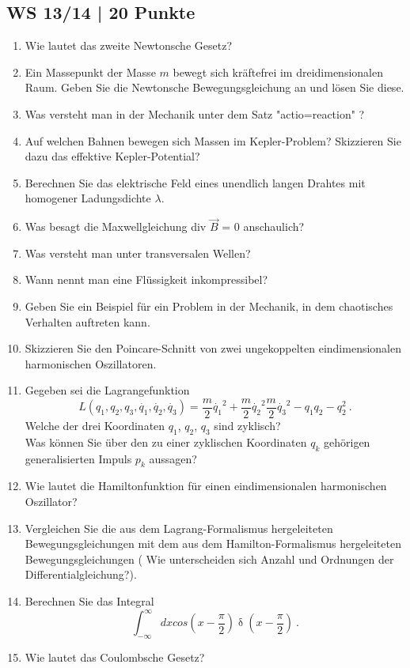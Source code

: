 \subsection{WS 13/14 | 20 Punkte}
\begin{enumerate}
    \item Wie lautet das zweite Newtonsche Gesetz?
    \item Ein Massepunkt der Masse $m$ bewegt sich kräftefrei im dreidimensionalen Raum. Geben Sie die Newtonsche Bewegungsgleichung an und lösen Sie diese.
    \item Was versteht man in der Mechanik unter dem Satz  "actio=reaction" ? 
    \item Auf welchen Bahnen bewegen sich Massen im Kepler-Problem? Skizzieren Sie dazu das effektive Kepler-Potential?
    \item Berechnen Sie das elektrische Feld eines unendlich langen Drahtes mit homogener Ladungsdichte $\lambda$.
    \item Was besagt die Maxwellgleichung div $\vec{B}$ = 0 anschaulich?
    \item Was versteht man unter transversalen Wellen?
    \item Wann nennt man eine Flüssigkeit inkompressibel?
    \item Geben Sie ein Beispiel für ein Problem in der Mechanik, in dem chaotisches Verhalten auftreten kann.
    \item Skizzieren Sie den Poincare-Schnitt von zwei ungekoppelten eindimensionalen harmonischen Oszillatoren.
    \item Gegeben sei die Lagrangefunktion
    \begin{equation*}
        L (q_1, q_2, q_3, \dot{q_1}, \dot{q_2}, \dot{q_3}) = \frac{m}{2} \dot{q_1}^2 +  \frac{m}{2} \dot{q_2}^2 \frac{m}{2} \dot{q_3}^2 - q_1 q_2 - q_2^2 \medspace .
    \end{equation*}
            Welche der drei Koordinaten $q_1$, $q_2$, $q_3$ sind zyklisch?\\
            Was können Sie über den zu einer zyklischen Koordinaten $q_k$ gehörigen generalisierten Impuls $p_k$ aussagen?
    \item Wie lautet die Hamiltonfunktion für einen eindimensionalen harmonischen Oszillator?
    \item Vergleichen Sie die aus dem Lagrang-Formalismus hergeleiteten Bewegungsgleichungen mit dem aus dem Hamilton-Formalismus hergeleiteten Bewegungsgleichungen ( Wie unterscheiden sich Anzahl und Ordnungen der Differentialgleichung?).
    \item Berechnen Sie das Integral
    \begin{equation*}
        \int_{-\infty}^{\infty} dx cos(x - \frac{\pi}{2}) \updelta (x - \frac{\pi}{2}) \medspace . 
    \end{equation*}
    \item Wie lautet das Coulombsche Gesetz?
\end{enumerate}


